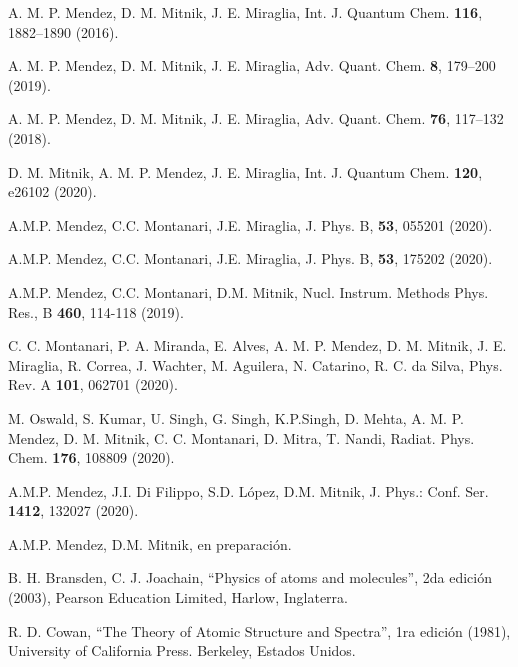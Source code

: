 
\begin{thebibliography}{9}

A. M. P. Mendez, D. M. Mitnik, J. E. Miraglia, 
Int. J. Quantum Chem. \textbf{116}, 1882--1890 (2016).

A. M. P. Mendez, D. M. Mitnik, J. E. Miraglia, 
Adv. Quant. Chem. \textbf{8}, 179--200 (2019).

A. M. P. Mendez, D. M. Mitnik, J. E. Miraglia, 
Adv. Quant. Chem. \textbf{76}, 117--132 (2018).

D. M. Mitnik, A. M. P. Mendez, J. E. Miraglia, 
Int. J. Quantum Chem. \textbf{120}, e26102 (2020).

A.M.P. Mendez, C.C. Montanari, J.E. Miraglia,
J. Phys. B, \textbf{53}, 055201 (2020).

A.M.P. Mendez, C.C. Montanari, J.E. Miraglia,
J. Phys. B, \textbf{53}, 175202 (2020). 

A.M.P. Mendez, C.C. Montanari, D.M. Mitnik, 
Nucl. Instrum. Methods Phys. Res., B \textbf{460}, 114-118 (2019).

C. C. Montanari, P. A. Miranda, E. Alves, A. M. P. Mendez,
D. M. Mitnik, J. E. Miraglia, R. Correa, J. Wachter, M. Aguilera, 
N. Catarino, R. C. da Silva,
Phys. Rev. A \textbf{101}, 062701 (2020). 

M. Oswald, S. Kumar, U. Singh, G. Singh, K.P.Singh, D. Mehta, 
A. M. P. Mendez, D. M. Mitnik, C. C. Montanari, D. Mitra, T. Nandi,
Radiat. Phys. Chem.  \textbf{176}, 108809 (2020).

A.M.P. Mendez, J.I. Di Filippo, S.D. López, D.M. Mitnik,
J. Phys.: Conf. Ser. \textbf{1412}, 132027 (2020).

A.M.P. Mendez, D.M. Mitnik, en preparación.



B. H. Bransden, C. J. Joachain,
``Physics of atoms and molecules'', 2da edición (2003),
Pearson Education Limited, Harlow, Inglaterra.

R. D. Cowan,
``The Theory of Atomic Structure and Spectra'', 1ra edición (1981),
University of California Press. Berkeley, Estados Unidos.


\end{thebibliography}

